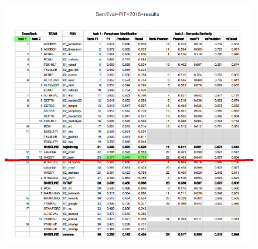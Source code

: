 \documentclass[11pt,letterpaper]{article}
\begin{document}
\begin{figure}[htp]
\centering
\includegraphics[width=\textwidth, height=\textheight, keepaspectratio]{SemEval2015Results}
\label{SemEval2015-Results}
\end{figure}


\clearpage

\end{document}

